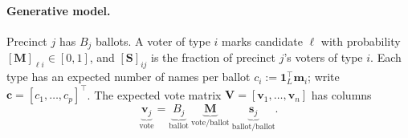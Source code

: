 \documentclass[11pt]{article}
\theoremstyle{remark}
\newcommand{\1}{\mathbf{1}}
\newcommand{\s}{\mathbf{s}}
\newcommand{\vv}{\mathbf{v}}
\newcommand{\m}{\mathbf{m}}
\newcommand{\M}{\mathbf{M}}
\newcommand{\Sm}{\mathbf{S}}
\begin{document}
\paragraph{Generative model.} Precinct $j$ has $B_j$ ballots. A voter of type $i$
marks candidate $\ell$ with probability $[\M]_{\ell i}\in[0,1]$, and
$[\Sm]_{ij}$ is the fraction of precinct $j$'s voters of type $i$. Each type has
an expected number of names per ballot $c_i := \1_L^\top\m_i$; write
$\mathbf c = [c_1,\dots,c_p]^\top$. The expected vote matrix
$\mathbf V=[\vv_1,\dots,\vv_n]$ has columns
\begin{equation}
  \underbrace{\vv_j}_{\text{vote}} = \underbrace{B_j}_{\text{ballot}}\ \underbrace{\M}_{\text{vote/ballot}}\ \underbrace{\s_j}_{\text{ballot/ballot}} .
  \label{eq:counts}
\end{equation}
\end{document}
